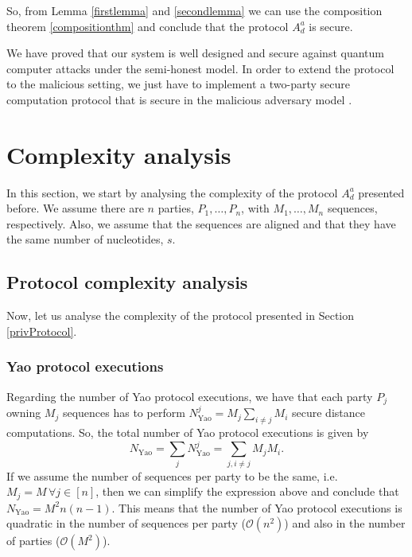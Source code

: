 So, from Lemma \ref{firstlemma} and \ref{secondlemma} we can use the composition theorem \ref{compositionthm} and conclude that the protocol $A^a_d$ is secure.

We have proved that our system is well designed and secure against quantum computer attacks under the semi-honest model. In order to extend the protocol to the malicious setting, we just have to implement a two-party secure computation protocol that is secure in the malicious adversary model \cite{Evans2018}. 




\section{Complexity analysis}\label{CompleAnalysis}


In this section, we start by analysing the complexity of the protocol $A^a_d$ presented before. We assume there are $n$ parties, $P_1, \ldots, P_n$, with $M_1, \ldots, M_n$ sequences, respectively. Also, we assume that the sequences are aligned and that they have the same number of nucleotides, $s$.


\subsection{Protocol complexity analysis}\label{compAnalysis}

Now, let us analyse the complexity of the protocol presented in Section \ref{privProtocol}. 

\subsubsection{Yao protocol executions}
Regarding the number of Yao protocol executions, we have that each party $P_j$ owning $M_j$ sequences has to perform $N_{\text{Yao}}^j = M_j\sum_{i\neq j} M_i$ secure distance computations. So, the total number of Yao protocol executions is given by
$$N_{\text{Yao}} = \sum_j N_{\text{Yao}}^j = \sum_{j, i\neq j} M_j M_i.$$
If we assume the number of sequences per party to be the same, i.e. $M_j = M\, \forall j\in[n]$, then we can simplify the expression above and conclude that $N_{\text{Yao}} = M^2 n(n-1)$. This means that the number of Yao protocol executions is quadratic in the number of sequences per party ($\mathcal{O}(n^2)$) and also in the number of parties ($\mathcal{O}(M^2)$). 

